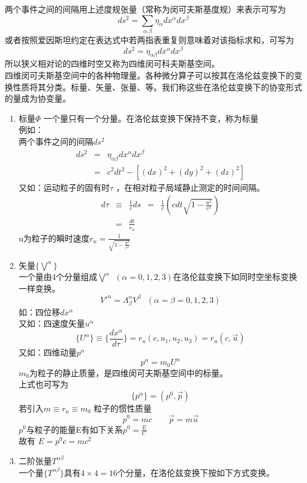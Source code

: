 \begin{enumerate}
两个事件之间的间隔用上述度规张量（常称为闵可夫斯基度规）来表示可写为
$$ds^{2}=\sum_{\alpha.\beta}\eta_{\alpha}dx^{\alpha}dx^{\beta}$$
或者按照爱因斯坦约定在表达式中若两指表重复则意味着对该指标求和，可写为
$$ds^{2}=\eta_{\alpha\beta}dx^{\alpha}dx^{\beta}$$
所以狭义相对论的四维时空又称为四维闵可科夫斯基空间。\\
四维闵可夫斯基空间中的各种物理量。各种微分算子可以按其在洛伦兹变换下的变换性质将其分类。标量、矢量、张量、等。我们称这些在洛伦兹变换下的协变形式的量成为协变量。\\
\begin{enumerate}
\item 标量$\Phi$
一个量只有一个分量。在洛伦兹变换下保持不变，称为标量\\
例如：\\
两个事件之间的间隔$ds^{2}$
$$
\begin{array}{rcl}
ds^{2}&=&\eta_{\alpha\beta}dx^{\alpha}dx^{\beta}\\
&=&c^{2} dt^{2}-[(dx)^{2}+(dy)^{2}+(dz)^{2}]
\end{array}
$$
又如：运动粒子的固有时$\tau$ ，在相对粒子局域静止测定的时间间隔。\\
$$
\begin{array}{rcccl}
d\tau & \equiv & \frac{1}{c}ds & = & \frac{1}{c}(cdt\sqrt{1-\frac{u^{2}}{c^{2}}})\\
 & = &\frac{dt}{r_{u}} & &
\end{array}
$$
u为粒子的瞬时速度$r_{u}=\frac{1}{\sqrt{1-\frac{u^{2}}{c^{2}}}}$
\item 矢量$\{\bigvee^{\alpha}\}$\\
一个量由4个分量组成$\bigvee^{\alpha} \ \ (\alpha=0,1,2,3)$在洛伦兹变换下如同时空坐标变换一样变换。
$$V'^{\alpha}=\Lambda^{\alpha}_{\beta}V^{\beta}\ \ \ (\alpha=\beta=0,1,2,3)$$
如：四位移$dx^{\alpha}$\\
又如：四速度矢量$u^{\alpha}$
$$\{U^{\alpha}\}\equiv\{\frac{dx^{\alpha}}{d\tau}\}=r_{u}(c,u_{1},u_{2},u_{3})=r_{u}(c,\overrightarrow{u})$$
又如：四维动量$p^{\alpha}$
$$p^{\alpha}=m_{0}U^{\alpha}$$
$m_{0}$为粒子的静止质量，是四维闵可夫斯基空间中的标量。\\
上式也可写为$$\{p^{\alpha}\}=(p^{0}, \overrightarrow{p})$$
若引入$m\equiv r_{u}\equiv m_{0}$ 粒子的惯性质量
$$p^{0}=mc\ \ \ \ \ \ \ \ \ \overrightarrow{p}=m\overrightarrow{u}$$
$p^{0}$与粒子的能量E有如下关系$p^{0}=\frac{E}{C}$\\
故有 $E=p^{0}c=mc^{2}$
\item 二阶张量$T^{\alpha\beta}$\\
一个量$\{T^{\alpha\beta}\}$具有$4\times4=16$个分量，在洛伦兹变换下按如下方式变换。

\end{enumerate}
\end{enumerate}

